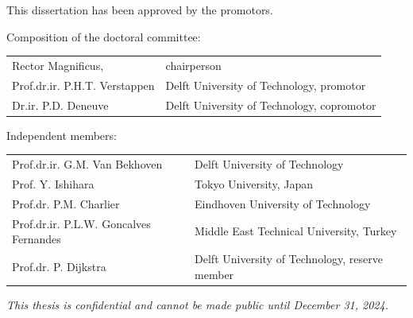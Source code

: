 \begin{titlepage}

This dissertation has been approved by the promotors.

\vspace{1em}
Composition of the doctoral committee:

\begin{tabular}{@{}ll}
Rector Magnificus, & chairperson \\
Prof.dr.ir. P.H.T. Verstappen & Delft University of Technology, promotor \\
Dr.ir. P.D. Deneuve & Delft University of Technology, copromotor \\
\end{tabular}

\vspace{1em}
Independent members:

\begin{tabular}{@{}ll}
Prof.dr.ir. G.M. Van Bekhoven & Delft University of Technology \\
Prof. Y. Ishihara & Tokyo University, Japan \\
Prof.dr. P.M. Charlier & Eindhoven University of Technology \\
Prof.dr.ir. P.L.W. Goncalves Fernandes & Middle East Technical University, Turkey \\
Prof.dr. P. Dijkstra & Delft University of Technology, reserve member \\
\end{tabular}
\bigskip
\bigskip

\emph{This thesis is confidential and cannot be made public until December 31, 2024.}

\begin{figure}[h]
  \begin{minipage}{0.2\textwidth}
    \fbox{\rule{0pt}{1.5cm}\rule{1.5cm}{0pt}} %
  \end{minipage}
  \begin{minipage}{0.2\textwidth}
    \fbox{\rule{0pt}{1.5cm}\rule{1.5cm}{0pt}} %
  \end{minipage}
\end{figure}


\end{titlepage}
